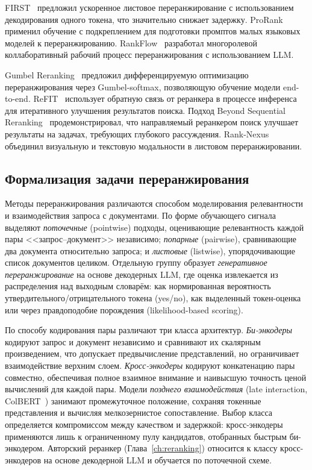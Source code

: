 FIRST~\cite{2406.15657} предложил ускоренное листовое переранжирование с использованием декодирования одного токена, что значительно снижает задержку. ProRank~\cite{2506.03487} применил обучение с подкреплением для подготовки промптов малых языковых моделей к переранжированию. RankFlow~\cite{2502.00709} разработал многоролевой коллаборативный рабочий процесс переранжирования с использованием LLM.

Gumbel Reranking~\cite{2502.11116} предложил дифференцируемую оптимизацию переранжирования через Gumbel-softmax, позволяющую обучение модели end-to-end. ReFIT~\cite{2305.11744} использует обратную связь от реранкера в процессе инференса для итеративного улучшения результатов поиска. Подход Beyond Sequential Reranking~\cite{2509.07163} продемонстрировал, что направляемый реранкером поиск улучшает результаты на задачах, требующих глубокого рассуждения. Rank-Nexus~\cite{2601.20623} объединил визуальную и текстовую модальности в листовом переранжировании.

\subsection{Формализация задачи переранжирования}\label{subsec:reranking_formalization}

Методы переранжирования различаются способом моделирования релевантности и взаимодействия запроса с документами. По форме обучающего сигнала выделяют \textit{поточечные} (pointwise) подходы, оценивающие релевантность каждой пары <<запрос--документ>> независимо; \textit{попарные} (pairwise), сравнивающие два документа относительно запроса; и \textit{листовые} (listwise), упорядочивающие список документов целиком. Отдельную группу образует \textit{генеративное переранжирование} на основе декодерных LLM, где оценка извлекается из распределения над выходным словарём: как нормированная вероятность утвердительного/отрицательного токена (yes/no), как выделенный токен-оценка или через правдоподобие порождения (likelihood-based scoring).

По способу кодирования пары различают три класса архитектур. \textit{Би-энкодеры} кодируют запрос и документ независимо и сравнивают их скалярным произведением, что допускает предвычисление представлений, но ограничивает взаимодействие верхним слоем. \textit{Кросс-энкодеры} кодируют конкатенацию пары совместно, обеспечивая полное взаимное внимание и наивысшую точность ценой вычислений для каждой пары. Модели \textit{позднего взаимодействия} (late interaction, ColBERT~\cite{2004.12832}) занимают промежуточное положение, сохраняя токенные представления и вычисляя мелкозернистое сопоставление. Выбор класса определяется компромиссом между качеством и задержкой: кросс-энкодеры применяются лишь к ограниченному пулу кандидатов, отобранных быстрым би-энкодером. Авторский реранкер (Глава~\ref{ch:reranking}) относится к классу кросс-энкодеров на основе декодерной LLM и обучается по поточечной схеме.

